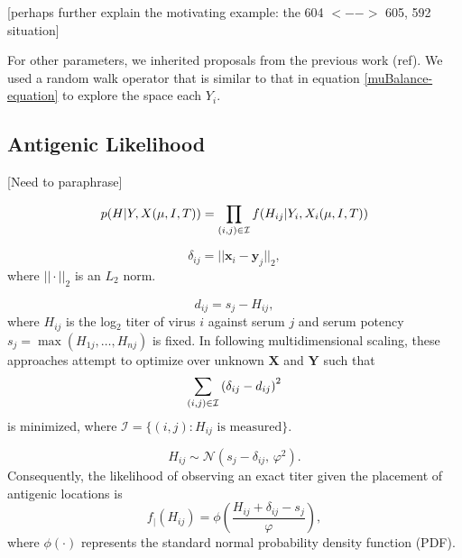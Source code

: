 \documentclass[11pt,oneside,letterpaper]{article}
\newcommand{\virus}{\mathbf{x}}						%
\newcommand{\serum}{\mathbf{y}}						%
\newcommand{\viruses}{\mathbf{X}}					%
\newcommand{\sera}{\mathbf{Y}}						%
\newcommand{\se}{s}									%
\newcommand{\point}{f_{\scriptscriptstyle \vert}}	%
\newcommand{\mdssd}{\varphi}						%
\newcommand{\vn}{n}									%
\newcommand{\normal}{\mathcal{N}}					%
\begin{document}
  [perhaps further explain the motivating example: the 604 $<-->$ 605, 592 situation]




For other parameters, we inherited proposals from the previous work (ref). We used a random walk operator that is similar to that in equation \ref{muBalance-equation} to explore the space each $Y_i$. 


\newpage




\subsection*{Antigenic Likelihood }

[Need to paraphrase]


\begin{equation}
 p(H|Y, X(\mu, I, T)) = \prod_{(i,j) \in \cal I} f(H_{ij} | Y_i, X_i (\mu, I, T)) 
\end{equation}



\begin{equation}
	\delta_{ij} =  || \virus_i - \serum_j ||_2,
\end{equation}
where $|| \cdot ||_2$ is an $L_2$ norm.



\begin{equation}
	d_{ij} =  \se_j - H_{ij},
\end{equation}
where $H_{ij}$ is the log$_2$ titer of virus $i$ against serum $j$ and serum potency $\se_j = \max ( H_{1j},\ldots,H_{\vn j} )$ is fixed.
In following multidimensional scaling, these approaches attempt to optimize over unknown $\viruses$ and $\sera$ such that
\begin{equation} \label{mds}
	\sum_{(i,j) \in \cal I} 
	\left(
		\delta_{ij} - d_{ij}
	\right)^2
\end{equation}
is minimized, where $\mathcal{I} = \{ (i,j) : H_{ij} \mbox{ is measured} \}$.



\begin{equation} \label{hij}
	H_{ij} \sim \normal( \se_j - \delta_{ij}, \, \mdssd^2 ).
\end{equation}
Consequently, the likelihood of observing an exact titer given the placement of antigenic locations is 
\begin{equation} 
	\point(H_{ij}) = \phi \left( \frac{ H_{ij} + \delta_{ij} - \se_j }{ \mdssd } \right),
\end{equation}
where $\phi(\cdot)$ represents the standard normal probability density function (PDF).
\end{document}
